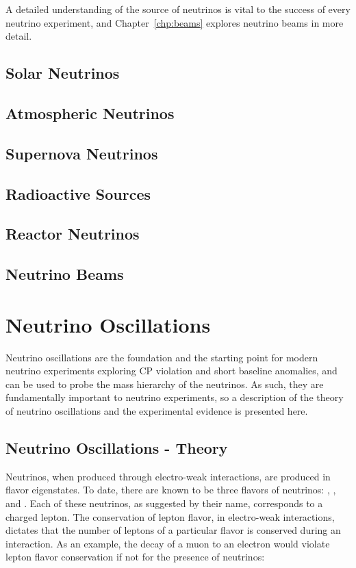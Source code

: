 A detailed understanding of the source of neutrinos is vital to the success of every neutrino experiment, and Chapter~\ref{chp:beams} explores neutrino beams in more detail.

\subsection{Solar Neutrinos}

\subsection{Atmospheric Neutrinos}

\subsection{Supernova Neutrinos}

\subsection{Radioactive Sources}

\subsection{Reactor Neutrinos}

\subsection{Neutrino Beams}

\section{Neutrino Oscillations}

Neutrino oscillations are the foundation and the starting point for modern neutrino experiments exploring CP violation and short baseline anomalies, and can be used to probe the mass hierarchy of the neutrinos.  As such, they are fundamentally important to neutrino experiments, so a description of the theory of neutrino oscillations and the experimental evidence is presented here.

\subsection{Neutrino Oscillations - Theory}


Neutrinos, when produced through electro-weak interactions, are produced in flavor eigenstates.  To date, there are known to be three flavors of neutrinos: \nue, \numu, and \nutau.  Each of these neutrinos, as suggested by their name, corresponds to a charged lepton.  The conservation of lepton flavor, in electro-weak interactions, dictates that the number of leptons of a particular flavor is conserved during an interaction.  As an example, the decay of a muon to an electron would violate lepton flavor conservation if not for the presence of neutrinos:

